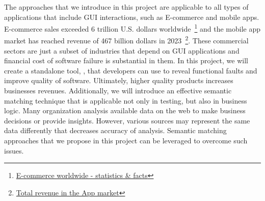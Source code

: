 \noindent
The approaches that we introduce in this project are applicable to all types of applications that include GUI interactions, such as E-commerce and mobile apps.
E-commerce sales exceeded 6 trillion U.S. dollars worldwide~\footnote{\href{https://www.statista.com/topics/871/online-shopping/}{E-commerce worldwide - statistics \& facts}} and
the mobile app market has reached revenue of 467 billion dollars in 2023~\footnote{\href{https://www.statista.com/outlook/dmo/app/worldwide}{Total revenue in the App market}}.
These commercial sectors are just a subset of industries that depend on GUI applications and financial cost of software failure is substantial in them.
In this project, we will create a standalone tool, \rltool, that developers can use to reveal functional faults and improve quality of software.
Ultimately, higher quality products increases businesses revenues.
%
Additionally, we will introduce an effective semantic matching technique that is applicable not only in testing, but also in business logic.
Many organization analysis available data on the web to make business decisions or provide insights. 
However, various sources may represent the same data differently that decreases accuracy of analysis. 
Semantic matching approaches that we propose in this project can be leveraged to overcome such issues.
